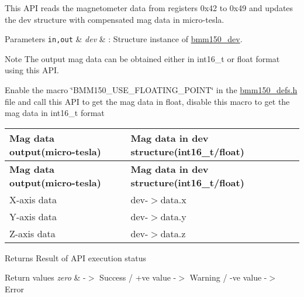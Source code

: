 This A\+PI reads the magnetometer data from registers 0x42 to 0x49 and updates the dev structure with compensated mag data in micro-\/tesla. 


\begin{DoxyParams}[1]{Parameters}
\mbox{\tt in,out}  & {\em dev} & \+: Structure instance of \hyperlink{structbmm150__dev}{bmm150\+\_\+dev}.\\
\hline
\end{DoxyParams}
\begin{DoxyNote}{Note}
The output mag data can be obtained either in int16\+\_\+t or float format using this A\+PI. 

Enable the macro \char`\"{}\+B\+M\+M150\+\_\+\+U\+S\+E\+\_\+\+F\+L\+O\+A\+T\+I\+N\+G\+\_\+\+P\+O\+I\+N\+T\char`\"{} in the \hyperlink{bmm150__defs_8h}{bmm150\+\_\+defs.\+h} file and call this A\+PI to get the mag data in float, disable this macro to get the mag data in int16\+\_\+t format
\end{DoxyNote}
\tabulinesep=1mm
\begin{longtabu} spread 0pt [c]{*{2}{|X[-1]}|}
\hline
\rowcolor{\tableheadbgcolor}\textbf{ Mag data output(micro-\/tesla) }&\textbf{ Mag data in dev structure(int16\+\_\+t/float)  }\\
\endfirsthead
\hline
\endfoot
\hline
\rowcolor{\tableheadbgcolor}\textbf{ Mag data output(micro-\/tesla) }&\textbf{ Mag data in dev structure(int16\+\_\+t/float)  }\\
\endhead
X-\/axis data &dev-\/$>$data.\+x \\
Y-\/axis data &dev-\/$>$data.\+y \\
Z-\/axis data &dev-\/$>$data.\+z \\
\end{longtabu}
\begin{DoxyReturn}{Returns}
Result of A\+PI execution status 
\end{DoxyReturn}

\begin{DoxyRetVals}{Return values}
{\em zero} & -\/$>$ Success / +ve value -\/$>$ Warning / -\/ve value -\/$>$ Error \\
\hline
\end{DoxyRetVals}
\mbox{\label{group___b_m_m150_ga6b8ebfb4d731d5880ef87ecffc72a43b}} 
